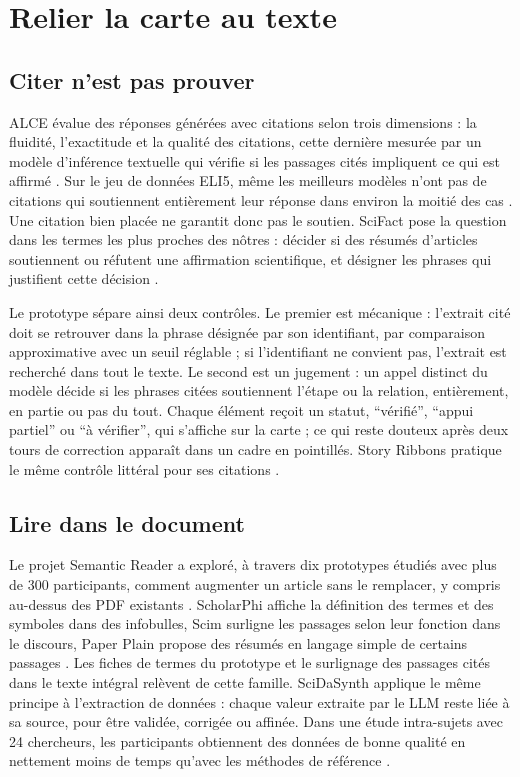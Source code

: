 \section{Relier la carte au texte}
\label{sec:ancrage}

\subsection{Citer n’est pas prouver}

ALCE évalue des réponses générées avec citations selon trois dimensions : la fluidité, l’exactitude et la qualité des citations, cette dernière mesurée par un modèle d’inférence textuelle qui vérifie si les passages cités impliquent ce qui est affirmé \parencite[6466]{ref17}. Sur le jeu de données ELI5, même les meilleurs modèles n’ont pas de citations qui soutiennent entièrement leur réponse dans environ la moitié des cas \parencite[6465]{ref17}. Une citation bien placée ne garantit donc pas le soutien. SciFact pose la question dans les termes les plus proches des nôtres : décider si des résumés d’articles soutiennent ou réfutent une affirmation scientifique, et désigner les phrases qui justifient cette décision \parencite[7534]{ref28}.

Le prototype sépare ainsi deux contrôles. Le premier est mécanique : l’extrait cité doit se retrouver dans la phrase désignée par son identifiant, par comparaison approximative avec un seuil réglable ; si l’identifiant ne convient pas, l’extrait est recherché dans tout le texte. Le second est un jugement : un appel distinct du modèle décide si les phrases citées soutiennent l’étape ou la relation, entièrement, en partie ou pas du tout. Chaque élément reçoit un statut, \enquote{vérifié}, \enquote{appui partiel} ou \enquote{à vérifier}, qui s’affiche sur la carte ; ce qui reste douteux après deux tours de correction apparaît dans un cadre en pointillés. Story Ribbons pratique le même contrôle littéral pour ses citations \parencite[3]{ref01}.

\subsection{Lire dans le document}

Le projet Semantic Reader \parencite{ref15} a exploré, à travers dix prototypes étudiés avec plus de 300 participants, comment augmenter un article sans le remplacer, y compris au-dessus des PDF existants \parencite[1]{ref15}. ScholarPhi affiche la définition des termes et des symboles dans des infobulles, Scim surligne les passages selon leur fonction dans le discours, Paper Plain propose des résumés en langage simple de certains passages \parencite[4--6]{ref15}. Les fiches de termes du prototype et le surlignage des passages cités dans le texte intégral relèvent de cette famille. SciDaSynth \parencite{ref16} applique le même principe à l’extraction de données : chaque valeur extraite par le LLM reste liée à sa source, pour être validée, corrigée ou affinée. Dans une étude intra-sujets avec 24 chercheurs, les participants obtiennent des données de bonne qualité en nettement moins de temps qu’avec les méthodes de référence \parencite[2, 10]{ref16}.

